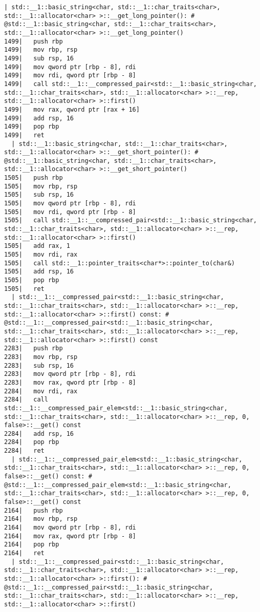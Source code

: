 \begin{lstlisting}[language={},numbers=none,title=\href{https://godbolt.org/z/hwKje8}{\texttt{godbolt.org/z/hwKje8}}]
  | std::__1::basic_string<char, std::__1::char_traits<char>, std::__1::allocator<char> >::__get_long_pointer(): # @std::__1::basic_string<char, std::__1::char_traits<char>, std::__1::allocator<char> >::__get_long_pointer()
1499|   push rbp
1499|   mov rbp, rsp
1499|   sub rsp, 16
1499|   mov qword ptr [rbp - 8], rdi
1499|   mov rdi, qword ptr [rbp - 8]
1499|   call std::__1::__compressed_pair<std::__1::basic_string<char, std::__1::char_traits<char>, std::__1::allocator<char> >::__rep, std::__1::allocator<char> >::first()
1499|   mov rax, qword ptr [rax + 16]
1499|   add rsp, 16
1499|   pop rbp
1499|   ret
  | std::__1::basic_string<char, std::__1::char_traits<char>, std::__1::allocator<char> >::__get_short_pointer(): # @std::__1::basic_string<char, std::__1::char_traits<char>, std::__1::allocator<char> >::__get_short_pointer()
1505|   push rbp
1505|   mov rbp, rsp
1505|   sub rsp, 16
1505|   mov qword ptr [rbp - 8], rdi
1505|   mov rdi, qword ptr [rbp - 8]
1505|   call std::__1::__compressed_pair<std::__1::basic_string<char, std::__1::char_traits<char>, std::__1::allocator<char> >::__rep, std::__1::allocator<char> >::first()
1505|   add rax, 1
1505|   mov rdi, rax
1505|   call std::__1::pointer_traits<char*>::pointer_to(char&)
1505|   add rsp, 16
1505|   pop rbp
1505|   ret
  | std::__1::__compressed_pair<std::__1::basic_string<char, std::__1::char_traits<char>, std::__1::allocator<char> >::__rep, std::__1::allocator<char> >::first() const: # @std::__1::__compressed_pair<std::__1::basic_string<char, std::__1::char_traits<char>, std::__1::allocator<char> >::__rep, std::__1::allocator<char> >::first() const
2283|   push rbp
2283|   mov rbp, rsp
2283|   sub rsp, 16
2283|   mov qword ptr [rbp - 8], rdi
2283|   mov rax, qword ptr [rbp - 8]
2284|   mov rdi, rax
2284|   call std::__1::__compressed_pair_elem<std::__1::basic_string<char, std::__1::char_traits<char>, std::__1::allocator<char> >::__rep, 0, false>::__get() const
2284|   add rsp, 16
2284|   pop rbp
2284|   ret
  | std::__1::__compressed_pair_elem<std::__1::basic_string<char, std::__1::char_traits<char>, std::__1::allocator<char> >::__rep, 0, false>::__get() const: # @std::__1::__compressed_pair_elem<std::__1::basic_string<char, std::__1::char_traits<char>, std::__1::allocator<char> >::__rep, 0, false>::__get() const
2164|   push rbp
2164|   mov rbp, rsp
2164|   mov qword ptr [rbp - 8], rdi
2164|   mov rax, qword ptr [rbp - 8]
2164|   pop rbp
2164|   ret
  | std::__1::__compressed_pair<std::__1::basic_string<char, std::__1::char_traits<char>, std::__1::allocator<char> >::__rep, std::__1::allocator<char> >::first(): # @std::__1::__compressed_pair<std::__1::basic_string<char, std::__1::char_traits<char>, std::__1::allocator<char> >::__rep, std::__1::allocator<char> >::first()

\end{lstlisting}
